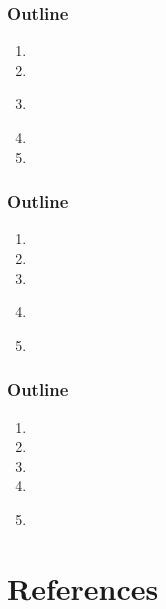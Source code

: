 \documentclass[usenames,dvipsnames]{beamer}
\begin{document}


\miniframesoff
  \begin{frame}
    \frametitle{\textbf{Outline}}
  \begin{enumerate}
    \item \introtitle
    \item \firsttitle
    \item \textbf{\secondtitle}
    \item \thirdtitle
    \item \conclusiontitle
  \end{enumerate}
  \end{frame}
\miniframeson



\miniframesoff
  \begin{frame}
    \frametitle{\textbf{Outline}}
  \begin{enumerate}
    \item \introtitle
    \item \firsttitle
    \item \secondtitle
    \item \textbf{\thirdtitle}
    \item \conclusiontitle
  \end{enumerate}
  \end{frame}
\miniframeson


  
\miniframesoff
  \begin{frame}
    \frametitle{\textbf{Outline}}
  \begin{enumerate}
    \item \introtitle
    \item \firsttitle
    \item \secondtitle
    \item \thirdtitle
    \item \textbf{\conclusiontitle}
  \end{enumerate}
  \end{frame}
\miniframeson

\hypertarget{references}{%
\section{References}\label{references}}
\end{document}
